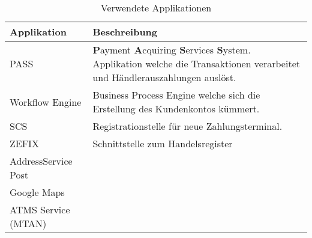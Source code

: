 \begin{table}[H]
	\centering
	\caption{Verwendete Applikationen}
	\begin{tabular}{ | p{2cm} | p{14cm} | }
		\toprule
		{\textbf{Applikation}} & {\textbf{Beschreibung}} \\
		\midrule
		PASS & \textbf{P}ayment \textbf{A}cquiring \textbf{S}ervices \textbf{S}ystem. Applikation welche die Transaktionen verarbeitet und Händlerauszahlungen auslöst. \\ \hline
		Workflow Engine & Business Process Engine welche sich die Erstellung des Kundenkontos kümmert.\\ \hline
		SCS & Registrationstelle für neue Zahlungsterminal.\\ \hline
		ZEFIX & Schnittstelle zum Handelsregister\\ \hline
		AddressService Post\\ \hline
		Google Maps\\ \hline
		ATMS Service (MTAN)\\
		\bottomrule
	\end{tabular}
\end{table}

